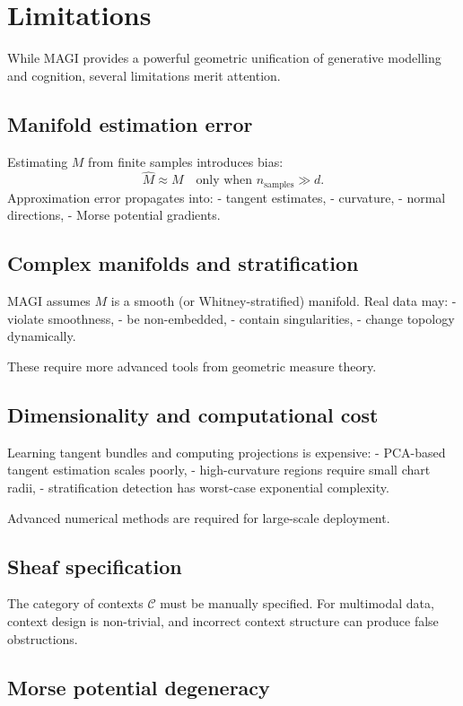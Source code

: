 \documentclass[11pt,a4paper,twocolumn]{article}
\begin{document}
\section{Limitations}

While MAGI provides a powerful geometric unification of generative
modelling and cognition, several limitations merit attention.

\subsection{Manifold estimation error}

Estimating $M$ from finite samples introduces bias:
\[
\widehat{M} \approx M
\quad \text{only when } n_{\mathrm{samples}} \gg d.
\]
Approximation error propagates into:
- tangent estimates,
- curvature,
- normal directions,
- Morse potential gradients.

\subsection{Complex manifolds and stratification}

MAGI assumes $M$ is a smooth (or Whitney-stratified) manifold.  
Real data may:
- violate smoothness,
- be non-embedded,
- contain singularities,
- change topology dynamically.

These require more advanced tools from geometric measure theory.

\subsection{Dimensionality and computational cost}

Learning tangent bundles and computing projections is expensive:
- PCA-based tangent estimation scales poorly,
- high-curvature regions require small chart radii,
- stratification detection has worst-case exponential complexity.

Advanced numerical methods are required for large-scale deployment.

\subsection{Sheaf specification}

The category of contexts $\mathcal{C}$ must be manually specified.
For multimodal data, context design is non-trivial, and incorrect
context structure can produce false obstructions.

\subsection{Morse potential degeneracy}
\end{document}
